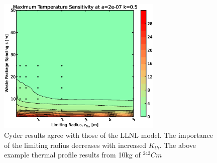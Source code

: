 \begin{figure}[htbp!]
\begin{center}
\includegraphics[width=0.7\textwidth]{./chapters/demonstration/spacing/rs.eps}
\end{center}
\caption[$\alpha_{th}$ vs. $r_{lim}$ Sensitivity in Cyder]
{Cyder results agree with 
those of the LLNL model. The importance of the limiting radius decreases with 
increased $K_{th}$. The above example thermal profile results from 10kg of 
$^{242}Cm$}
\label{fig:rs}
\end{figure}
